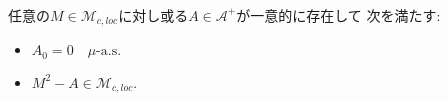 	\begin{screen}
		\begin{thm}[二次変分の存在]\mbox{}\\
			任意の$M \in \mathcal{M}_{c,loc}$に対し或る$A \in \mathcal{A}^+$が一意的に存在して\footnotemark
			次を満たす:
			\begin{itemize}
				\item $A_0 = 0\quad \mbox{$\mu$-a.s.}$
				\item $M^2 - A \in \mathcal{M}_{c,loc}.$
			\end{itemize}
		\end{thm}
	\end{screen}
	
	
